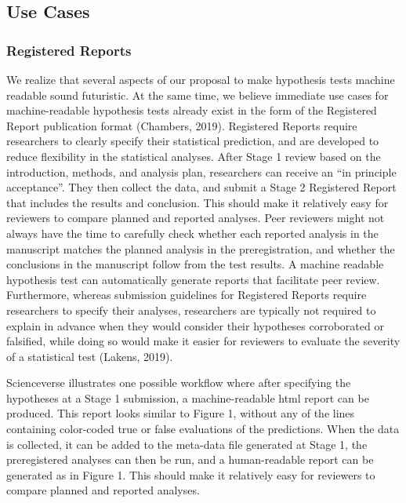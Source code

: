 \documentclass[
  english,
  doc,floatsintext]{apa6}
\begin{document}
\hypertarget{use-cases}{%
\subsection{Use Cases}\label{use-cases}}

\hypertarget{registered-reports}{%
\subsubsection{Registered Reports}\label{registered-reports}}

We realize that several aspects of our proposal to make hypothesis tests machine readable sound futuristic. At the same time, we believe immediate use cases for machine-readable hypothesis tests already exist in the form of the Registered Report publication format (Chambers, 2019). Registered Reports require researchers to clearly specify their statistical prediction, and are developed to reduce flexibility in the statistical analyses. After Stage 1 review based on the introduction, methods, and analysis plan, researchers can receive an \enquote{in principle acceptance}. They then collect the data, and submit a Stage 2 Registered Report that includes the results and conclusion. This should make it relatively easy for reviewers to compare planned and reported analyses. Peer reviewers might not always have the time to carefully check whether each reported analysis in the manuscript matches the planned analysis in the preregistration, and whether the conclusions in the manuscript follow from the test results. A machine readable hypothesis test can automatically generate reports that facilitate peer review. Furthermore, whereas submission guidelines for Registered Reports require researchers to specify their analyses, researchers are typically not required to explain in advance when they would consider their hypotheses corroborated or falsified, while doing so would make it easier for reviewers to evaluate the severity of a statistical test (Lakens, 2019).

Scienceverse illustrates one possible workflow where after specifying the hypotheses at a Stage 1 submission, a machine-readable html report can be produced. This report looks similar to Figure 1, without any of the lines containing color-coded true or false evaluations of the predictions. When the data is collected, it can be added to the meta-data file generated at Stage 1, the preregistered analyses can then be run, and a human-readable report can be generated as in Figure 1. This should make it relatively easy for reviewers to compare planned and reported analyses.
\end{document}
